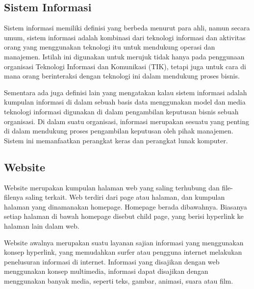 \documentclass{jtetiproposalskripsi}
\begin{document}
\subsection{Sistem Informasi}
Sistem informasi memiliki definisi yang berbeda menurut para ahli, namun secara umum, sistem informasi adalah kombinasi dari teknologi informasi dan aktivitas orang yang menggunakan teknologi itu untuk mendukung operasi dan manajemen. Istilah ini digunakan untuk merujuk tidak hanya pada penggunaan organisasi Teknologi Informasi dan Komunikasi (TIK), tetapi juga untuk cara di mana orang berinteraksi dengan teknologi ini dalam mendukung proses bisnis.

Sementara ada juga definisi lain yang mengatakan kalau sistem informasi adalah kumpulan informasi di dalam sebuah basis data menggunakan model dan media teknologi informasi digunakan di dalam pengambilan keputusan bisnis sebuah organisasi. Di dalam suatu organisasi, informasi merupakan sesuatu yang penting di dalam mendukung proses pengambilan keputusan oleh pihak manajemen. Sistem ini memanfaatkan perangkat keras dan perangkat lunak komputer.

\subsection{Website}
Website merupakan kumpulan halaman web yang saling terhubung dan file-filenya  saling terkait. Web terdiri dari page atau halaman, dan kumpulan halaman yang dinamanakan homepage. Homepage berada dibawahnya. Biasanya setiap halaman di bawah homepage disebut child page, yang berisi hyperlink ke halaman lain dalam web.

Website awalnya merupakan suatu layanan sajian informasi yang menggunakan konsep hyperlink, yang memudahkan surfer atau pengguna internet melakukan penelusuran informasi di internet. Informasi yang disajikan dengan web menggunakan konsep multimedia, informasi dapat disajikan dengan menggunakan banyak media, seperti teks, gambar, animasi, suara atau film.
\end{document}
